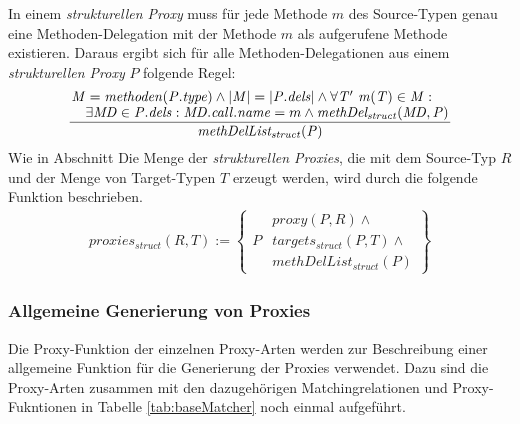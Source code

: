 \documentclass[a4paper,12pt]{article}
\begin{document}
In einem \emph{strukturellen Proxy} muss für jede Methode $m$ des Source-Typen genau eine Methoden-Delegation mit der Methode $m$ als aufgerufene Methode existieren. Daraus ergibt sich für alle Methoden-Delegationen aus einem \emph{strukturellen Proxy} $P$ folgende Regel:
\begin{gather*}
\frac{\splitfrac{\mathit{M} = \mathit{methoden(P.type)} \wedge |\mathit{M}| = |\mathit{P.dels}| \wedge \forall \mathit{T' \text{ }m(T)} \in \mathit{M}:}{\exists \mathit{MD} \in \mathit{P.dels}:\mathit{MD.call.name} = m \wedge \mathit{methDel_{struct}(MD,P)}
 }
}
{\mathit{methDelList_{struct}(P)}}
\end{gather*}
Wie in Abschnitt 
Die Menge der \emph{strukturellen Proxies}, die mit dem Source-Typ $R$ und der Menge von Target-Typen $T$ erzeugt werden, wird durch die folgende Funktion beschrieben.
\begin{gather*}
\mathit{proxies_{struct}(R,T)} := 
\left\{\begin{array}{l|l}
		& \mathit{proxy(P,R)}\wedge \mathit{ }\\
	P	& \mathit{targets_{struct}(P,T)} \wedge \mathit{ }\\
		& \mathit{methDelList_{struct}(P)}  
		 \end{array}
\right\}
\end{gather*}

\subsubsection{Allgemeine Generierung von Proxies}
Die Proxy-Funktion der einzelnen Proxy-Arten werden zur Beschreibung einer allgemeine Funktion für die Generierung der Proxies verwendet. Dazu sind die Proxy-Arten zusammen mit den dazugehörigen Matchingrelationen und Proxy-Fukntionen in Tabelle \ref{tab:baseMatcher} noch einmal aufgeführt.
\end{document}
